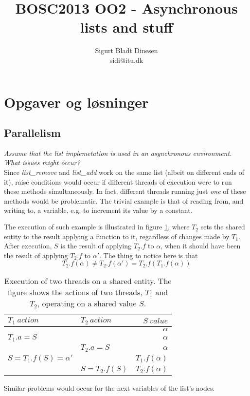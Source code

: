 \documentclass[a4paper, titlepage]{article}
\begin{document}
\title{BOSC2013 OO2 - Asynchronous lists and stuff}
\author{Sigurt Bladt Dinesen \\sidi{@}itu.dk}
\maketitle
\section*{Opgaver og løsninger}
\subsection*{Parallelism}
\textit{Assume that the list implemetation is used in an asynchronous
environment. What issues might occur?}\\

Since \emph{list\_remove} and \emph{list\_add} work on the same list (albeit on
different ends of it), raise conditions would occur if different threads of
execution were to run these methods simultaneously. In fact, different threads
running just \textit{one} of these methods would be problematic. The trivial
example is that of reading from, and writing to, a variable, e.g. to increment
its value by a constant.

The execution of such example is illustrated in figure
\ref{tab:threadaccess}, where $T_2$ sets the shared entity to the result
applying a function to it, regardless of changes made by $T_1$. After
execution, $S$ is the result of applying $T_2.f$ to $\alpha$, when it should
have been the result of applying $T_2.f$ to $\alpha'$. The thing to notice here
is that $$T_2.f(\alpha) \neq T_2.f(\alpha') = T_2.f(T_1.f(\alpha))$$

\begin{table}[hbtp]
	\centering
	\begin{tabular}{|l|l|r|}
		\hline
		$T_1\ action$&$T_2\ action$&$S\ value$\\
		\hline
		&&$\alpha$\\
		\hline
		$T_1.a = S$&&$\alpha$\\
		\hline
		&$T_2.a = S$&$\alpha$\\
		\hline
		$S = T_1.f(S) = \alpha'$&&$T_1.f(\alpha)$\\
		\hline
		&$S = T_2.f(S)$&$T_2.f(\alpha)$\\
		\hline
	\end{tabular}
	\caption{
		Execution of two threads on a shared entity. The figure shows
		the actions of two threads, $T_1$ and $T_2$, operating on a
		shared value $S$.
		\label{tab:threadaccess}
	}
\end{table}


Similar problems would
occur for the next variables of the list's nodes.

\pagebreak
[name=prod]





\end{document}
